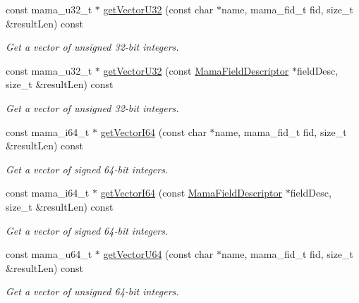 \begin{DoxyCompactItemize}
const mama\_\-u32\_\-t $\ast$ \hyperlink{classWombat_1_1MamaMsg_a1de21a544bad98ebf4a6cb30f241bf7e}{getVectorU32} (const char $\ast$name, mama\_\-fid\_\-t fid, size\_\-t \&resultLen) const 
\begin{DoxyCompactList}\small\item\em Get a vector of unsigned 32-\/bit integers. \item\end{DoxyCompactList}\item 
const mama\_\-u32\_\-t $\ast$ \hyperlink{classWombat_1_1MamaMsg_a5fa8cbacf9e5f8fef18be507b9cb685c}{getVectorU32} (const \hyperlink{classWombat_1_1MamaFieldDescriptor}{MamaFieldDescriptor} $\ast$fieldDesc, size\_\-t \&resultLen) const 
\begin{DoxyCompactList}\small\item\em Get a vector of unsigned 32-\/bit integers. \item\end{DoxyCompactList}\item 
const mama\_\-i64\_\-t $\ast$ \hyperlink{classWombat_1_1MamaMsg_a0dd9089d544e24910d14142dbe6a6449}{getVectorI64} (const char $\ast$name, mama\_\-fid\_\-t fid, size\_\-t \&resultLen) const 
\begin{DoxyCompactList}\small\item\em Get a vector of signed 64-\/bit integers. \item\end{DoxyCompactList}\item 
const mama\_\-i64\_\-t $\ast$ \hyperlink{classWombat_1_1MamaMsg_a608717833fd046f1f157c4e4752b8feb}{getVectorI64} (const \hyperlink{classWombat_1_1MamaFieldDescriptor}{MamaFieldDescriptor} $\ast$fieldDesc, size\_\-t \&resultLen) const 
\begin{DoxyCompactList}\small\item\em Get a vector of signed 64-\/bit integers. \item\end{DoxyCompactList}\item 
const mama\_\-u64\_\-t $\ast$ \hyperlink{classWombat_1_1MamaMsg_a907a4297ff0b7153b94984b970273d04}{getVectorU64} (const char $\ast$name, mama\_\-fid\_\-t fid, size\_\-t \&resultLen) const 
\begin{DoxyCompactList}\small\item\em Get a vector of unsigned 64-\/bit integers. \item\end{DoxyCompactList}\item 

\end{DoxyCompactItemize}
